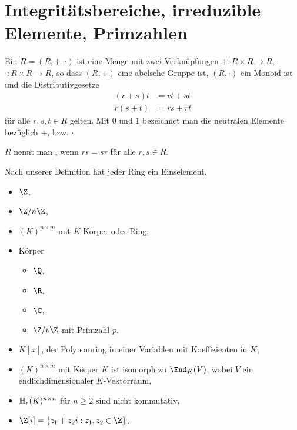 \chapter{Integritätsbereiche, irreduzible Elemente, Primzahlen}


\begin{df*}
	Ein  $R = (R, +, \cdot)$ ist eine Menge mit zwei Verknüpfungen $+: R \times R \to R$, $\cdot: R \times R \to R$, so dass $(R, +)$ eine abelsche Gruppe ist, $(R, \cdot)$ ein Monoid ist und die Distributivgesetze
	\begin{align*}
		(r+s)t &= rt + st \\
		r(s+t) &= rs + rt
	\end{align*}
	für alle $r, s, t \in R$ gelten.
	Mit $0$ und $1$ bezeichnet man die neutralen Elemente bezüglich $+$, bzw. $\cdot$.

	$R$ nennt man , wenn $rs = sr$ für alle $r,s \in R$.
	\begin{note}
		Nach unserer Definition hat jeder Ring ein Einselement.
	\end{note}
\end{df*}

\begin{ex*}
	\begin{itemize}
		\item
			$\Z$,
		\item
			$\Z / n \Z$,
		\item
			$(K)^{n\times m}$ mit $K$ Körper oder Ring,
		\item
			Körper
			\begin{itemize}
				\item
					$\Q$,
				\item
					$\R$,
				\item
					$\C$,
				\item
					$\Z / p \Z$ mit Primzahl $p$.
			\end{itemize}
		\item
			$K[x]$, der Polynomring in einer Variablen mit Koeffizienten in $K$,
		\item
			$(K)^{n\times m}$ mit Körper $K$ ist isomorph zu $\End_K(V)$, wobei $V$ ein endlichdimensionaler $K$-Vektorraum,
		\item
			$\mathbb{H}, (K)^{n\times n}$ für $n \ge 2$ sind nicht kommutativ,
		\item
			$\Z[i] = \{ z_1 + z_2 i : z_1, z_2 \in \Z \}$.
	\end{itemize}
\end{ex*}


